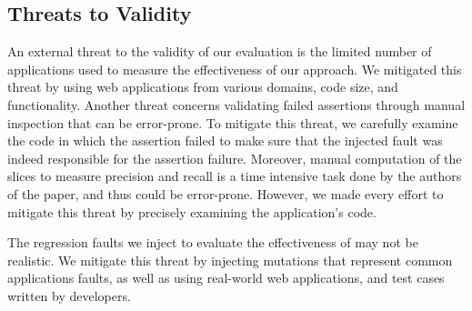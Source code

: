 \subsection{Threats to Validity} \label{Sec:threatsToValidity}
An external threat to the validity of our evaluation is the limited number of \javascript applications used to measure the effectiveness of our approach. We mitigated this threat by using web applications from various domains, code size, and functionality. Another threat concerns validating failed assertions through manual inspection that can be error-prone. To mitigate this threat, we carefully examine the code in which the assertion failed to make sure that the injected fault was indeed responsible for the assertion failure. Moreover, manual computation of the \javascript slices to measure precision and recall is a time intensive task done by the authors of the paper, and thus could be error-prone. However, we made every effort to mitigate this threat by precisely examining the application's code.

The regression faults we inject to evaluate the effectiveness of \tool may not be realistic. We mitigate this threat by injecting mutations that represent common \javascript applications faults, as well as using real-world web applications, and \selenium test cases written by developers.